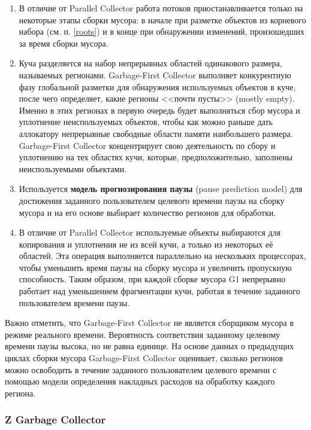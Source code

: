 \begin{enumerate}[label*=\arabic*.]
	\item В отличие от Parallel Collector работа потоков приостанавливается только на некоторые этапы сборки мусора: в начале при разметке объектов из корневого набора (см. п. \ref{roots}) и в конце при обнаружении изменений, произошедших за время сборки мусора. \cite{java_jrockit_memory} %
	\item Куча разделяется на набор непрерывных областей одинакового размера, называемых регионами. Garbage-First Collector выполняет конкурентную фазу глобальной разметки для обнаружения используемых объектов в куче, после чего определяет, какие регионы <<почти пусты>> (mostly empty). Именно в этих регионах в первую очередь будет выполняться сбор мусора и уплотнение неиспользуемых объектов, чтобы как можно раньше дать аллокатору непрерывные свободные области памяти наибольшего размера. Garbage-First Collector концентрирует свою деятельность по сбору и уплотнению на тех областях кучи, которые, предположительно, заполнены неиспользуемыми объектами. 
	\item Используется \textbf{модель прогнозирования паузы} (pause prediction model) для достижения заданного пользователем целевого времени паузы на сборку мусора и на его основе выбирает количество регионов для обработки.
	\item В отличие от Parallel Collector используемые объекты выбираются для копирования и уплотнения не из всей кучи, а только из некоторых её областей. Эта операция выполняется параллельно на нескольких процессорах, чтобы уменьшить время паузы на сборку мусора и увеличить пропускную способность. Таким образом, при каждой сборке мусора G1 непрерывно работает над уменьшением фрагментации кучи, работая в течение заданного пользователем времени паузы.
\end{enumerate}

Важно отметить, что Garbage-First Collector не является сборщиком мусора в режиме реального времени. Вероятность соответствия заданному целевому времени паузы высока, но не равна единице. На основе данных о предыдущих циклах сборки мусора Garbage-First Collector оценивает, сколько регионов можно освободить в течение заданного пользователем целевого времени с помощью модели определения накладных расходов на обработку каждого региона.~\cite{java_g1}


\subsubsection{Z Garbage Collector}

